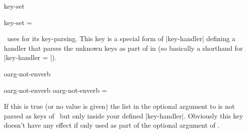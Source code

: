 \begin{function}{key-set}
  \begin{syntax}
    key-set = 
  \end{syntax}
  \envlogo\ uses  for its key-parsing. This key is a special form of
  |key-handler| defining a handler that parses the unknown keys as part of
   in  (so basically a shorthand for
  |key-handler = |).
\end{function}

\begin{function}{oarg-not-enverb}
  \begin{syntax}
    oarg-not-enverb
    oarg-not-enverb = 
  \end{syntax}
  If this is true (or no value is given) the  list in the
  optional argument to  is not parsed as keys of \envlogo\ but only
  inside your defined |key-handler|. Obviously this key doesn't have any effect
  if only used as part of the optional argument of .
\end{function}

